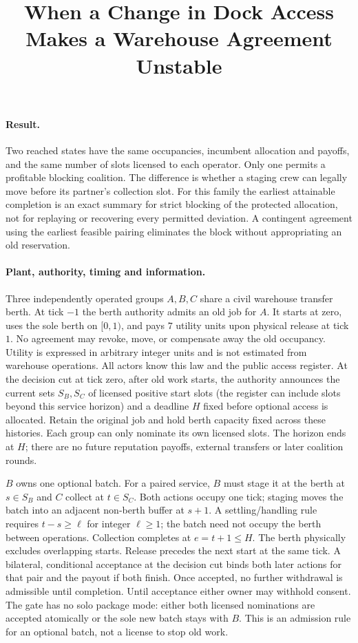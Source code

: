 \documentclass[11pt]{article}
\title{When a Change in Dock Access Makes a Warehouse Agreement Unstable}
\author{}
\date{}
\begin{document}
\maketitle

\paragraph{Result.} Two reached states have the same occupancies, incumbent allocation and payoffs, and the same number of slots licensed to each operator. Only one permits a profitable blocking coalition. The difference is whether a staging crew can legally move before its partner's collection slot. For this family the earliest attainable completion is an exact summary for strict blocking of the protected allocation, not for replaying or recovering every permitted deviation. A contingent agreement using the earliest feasible pairing eliminates the block without appropriating an old reservation.

\paragraph{Plant, authority, timing and information.}
Three independently operated groups $A,B,C$ share a civil warehouse transfer berth. At tick $-1$ the berth authority admits an old job for $A$. It starts at zero, uses the sole berth on $[0,1)$, and pays $7$ utility units upon physical release at tick $1$. No agreement may revoke, move, or compensate away the old occupancy. Utility is expressed in arbitrary integer units and is not estimated from warehouse operations. All actors know this law and the public access register. At the decision cut at tick zero, after old work starts, the authority announces the current sets $S_B,S_C$ of licensed positive start slots (the register can include slots beyond this service horizon) and a deadline $H$ fixed before optional access is allocated. Retain the original job and hold berth capacity fixed across these histories. Each group can only nominate its own licensed slots. The horizon ends at $H$; there are no future reputation payoffs, external transfers or later coalition rounds.

$B$ owns one optional batch. For a paired service, $B$ must stage it at the berth at $s\in S_B$ and $C$ collect at $t\in S_C$. Both actions occupy one tick; staging moves the batch into an adjacent non-berth buffer at $s+1$. A settling/handling rule requires $t-s\ge \ell$ for integer $\ell\ge 1$; the batch need not occupy the berth between operations. Collection completes at $e=t+1\le H$. The berth physically excludes overlapping starts. Release precedes the next start at the same tick. A bilateral, conditional acceptance at the decision cut binds both later actions for that pair and the payout if both finish. Once accepted, no further withdrawal is admissible until completion. Until acceptance either owner may withhold consent. The gate has no solo package mode: either both licensed nominations are accepted atomically or the sole new batch stays with $B$. This is an admission rule for an optional batch, not a license to stop old work.
\end{document}
